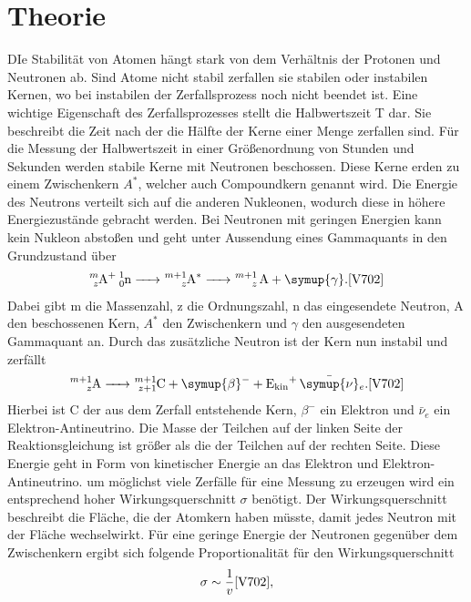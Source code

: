 \section{Theorie}\justifying
DIe Stabilität von Atomen hängt stark von dem Verhältnis der Protonen und Neutronen ab. Sind
Atome nicht stabil zerfallen sie stabilen oder instabilen Kernen, wo bei instabilen der Zerfallsprozess
noch nicht beendet ist.  Eine wichtige Eigenschaft des Zerfallsprozesses stellt die Halbwertszeit T
dar. Sie beschreibt die Zeit nach der die Hälfte der Kerne einer Menge zerfallen sind.
Für die Messung der Halbwertszeit in einer Größenordnung von Stunden und Sekunden werden
stabile Kerne mit Neutronen beschossen. Diese Kerne erden zu einem Zwischenkern $A^*$, welcher
auch Compoundkern genannt wird. Die Energie des Neutrons verteilt sich auf die anderen Nukleonen,
wodurch diese in höhere Energiezustände gebracht werden. Bei Neutronen mit geringen 
Energien kann kein Nukleon abstoßen und geht unter Aussendung eines Gammaquants in den Grundzustand über
\begin{align}
    \ce{_z^mA+ _0^1n -> _z^{m+1}A^* -> _z^{m+1} A + \symup{\gamma}}. \label{eq:1} \text{\cite{V702}}
\end{align}
Dabei gibt m die Massenzahl, z die Ordnungszahl, n das eingesendete Neutron, A den beschossenen Kern,
$A^*$ den Zwischenkern und $\gamma$ den ausgesendeten Gammaquant an. Durch das zusätzliche
Neutron ist der Kern nun instabil und zerfällt
\begin{align}
    \ce{_z^{m+1}A -> _{z+1}^{m+1}C + \symup{\beta}^- + E_{\text{kin}}+ \bar{\symup{\nu}}_e } \label{eq:2}.\text{\cite{V702}}
\end{align}
Hierbei ist C der aus dem Zerfall entstehende Kern, $\beta ^-$ ein Elektron und $\bar{\nu}_e$ ein Elektron-Antineutrino.
Die Masse der Teilchen auf der linken Seite der Reaktionsgleichung ist größer als die der Teilchen auf
der rechten Seite. Diese Energie geht in Form von kinetischer Energie an das Elektron und
Elektron-Antineutrino. um möglichst viele Zerfälle für eine Messung zu erzeugen wird ein
entsprechend hoher Wirkungsquerschnitt $\sigma$ benötigt. Der Wirkungsquerschnitt beschreibt
die Fläche, die der Atomkern haben müsste, damit jedes Neutron mit der Fläche wechselwirkt.
Für eine geringe Energie der Neutronen gegenüber dem Zwischenkern ergibt sich folgende
Proportionalität für den Wirkungsquerschnitt
\begin{align}
    \sigma \sim \frac{1}{v} \text{\cite{V702}}, \label{eq:3}
\end{align}
